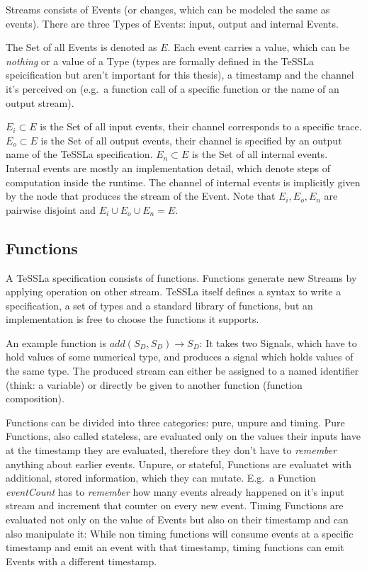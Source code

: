 Streams consists of Events (or changes, which can be modeled the same as events).
There are three Types of Events: input, output and internal Events.

The Set of all Events is denoted as \(E\).
Each event carries a value, which can be \emph{nothing} or a value of a Type (types are formally defined in the TeSSLa speicification but aren't important for this thesis), a timestamp and the channel it's perceived on (e.g.\ a function call of a specific function or the name of an output stream).

\(E_i \subset E\) is the Set of all input events, their channel corresponds to a specific trace.
\(E_o \subset E\) is the Set of all output events, their channel is specified by an output name of the TeSSLa specification.
\(E_n \subset E\) is the Set of all internal events.
Internal events are mostly an implementation detail, which denote steps of computation inside the runtime.
The channel of internal events is implicitly given by the node that produces the stream of the Event.
Note that \(E_i, E_o, E_n\) are pairwise disjoint and \(E_i \cup E_o \cup E_n = E\).

\subsection{Functions}
\label{sec:concepts:defs:functions}

A TeSSLa specification consists of functions.
Functions generate new Streams by applying operation on other stream.
TeSSLa itself defines a syntax to write a specification, a set of types and a standard library of functions, but an implementation is free to choose the functions it supports.

An example function is \(add(S_D,S_D) \rightarrow S_D\): It takes two Signals, which have to hold values of some numerical type, and produces a signal which holds values of the same type.
The produced stream can either be assigned to a named identifier (think: a variable) or directly be given to another function (function composition).

Functions can be divided into three categories: pure, unpure and timing.
Pure Functions, also called stateless, are evaluated only on the values their inputs have at the timestamp they are evaluated, therefore they don't have to \emph{remember} anything about earlier events.
Unpure, or stateful, Functions are evaluatet with additional, stored information, which they can mutate.
E.g.\ a Function \emph{eventCount} has to \emph{remember} how many events already happened on it's input stream and increment that counter on every new event.
Timing Functions are evaluated not only on the value of Events but also on their timestamp and can also manipulate it:
While non timing functions will consume events at a specific timestamp and emit an event with that timestamp, timing functions can emit Events with a different timestamp.

